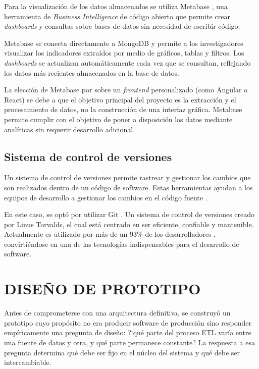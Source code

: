 \documentclass[12pt,letterpaper,oneside]{report}
\begin{document}
Para la visualizaci\'on de los datos almacenados se utiliza Metabase \parencite{metabase}, una herramienta de \textit{Business Intelligence} de c\'odigo abierto que permite crear \textit{dashboards} y consultas sobre bases de datos sin necesidad de escribir c\'odigo.

Metabase se conecta directamente a MongoDB y permite a los investigadores visualizar los indicadores extra\'idos por medio de gr\'aficos, tablas y filtros. Los \textit{dashboards} se actualizan autom\'aticamente cada vez que se consultan, reflejando los datos m\'as recientes almacenados en la base de datos.

La elecci\'on de Metabase por sobre un \textit{frontend} personalizado (como Angular o React) se debe a que el objetivo principal del proyecto es la extracci\'on y el procesamiento de datos, no la construcci\'on de una interfaz gr\'afica. Metabase permite cumplir con el objetivo de poner a disposici\'on los datos mediante anal\'iticas sin requerir desarrollo adicional.

\section{Sistema de control de versiones}
\label{sec:control-versiones}

Un sistema de control de versiones permite rastrear y gestionar los cambios que son realizados dentro de un c\'odigo de software. Estas herramientas ayudan a los equipos de desarrollo a gestionar los cambios en el c\'odigo fuente \parencite{atlassian}.

En este caso, se opt\'o por utilizar Git \parencite{git}. Un sistema de control de versiones creado por Linus Torvalds, el cual est\'a centrado en ser eficiente, confiable y mantenible. Actualmente es utilizado por m\'as de un 93\% de los desarrolladores \parencite{stackoverflow2021}, convirti\'endose en una de las tecnolog\'ias indispensables para el desarrollo de software.


\chapter{DISE\~NO DE PROTOTIPO}
\label{ch:prototipo}

Antes de comprometerse con una arquitectura definitiva, se construy\'o un prototipo cuyo prop\'osito no era producir software de producci\'on sino responder emp\'iricamente una pregunta de dise\~no: ?`qu\'e parte del proceso ETL var\'ia entre una fuente de datos y otra, y qu\'e parte permanece constante? La respuesta a esa pregunta determina qu\'e debe ser fijo en el n\'ucleo del sistema y qu\'e debe ser intercambiable.
\end{document}

